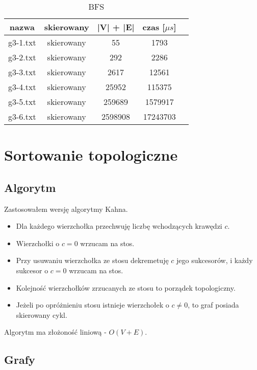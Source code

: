 \documentclass[12pt, letterpaper]{article}
\begin{document}
\begin{table}[H]\centering
    \caption{BFS}
    \begin{tabular}{|c|c|c|c|c|}\hline
        nazwa    & skierowany & |V| + |E| & czas [$\mu s$] \\\hline
        g3-1.txt & skierowany & 55        & 1793      \\\hline
        g3-2.txt & skierowany & 292       & 2286      \\\hline
        g3-3.txt & skierowany & 2617      & 12561     \\\hline
        g3-4.txt & skierowany & 25952     & 115375    \\\hline
        g3-5.txt & skierowany & 259689    & 1579917   \\\hline
        g3-6.txt & skierowany & 2598908   & 17243703  \\\hline
    \end{tabular}
\end{table}

\clearpage

\section{Sortowanie topologiczne}

\subsection{Algorytm}

Zastosowałem wersję algorytmy Kahna.

\begin{itemize}
    \item Dla każdego wierzchołka przechwuję liczbę wchodzących krawędzi $c$.
    \item Wierzchołki o $c=0$ wrzucam na stos.
    \item Przy usuwaniu wierzchołka ze stosu dekremetuję $c$ jego sukcesorów,
          i każdy sukcesor o $c=0$ wrzucam na stos.
    \item Kolejność wierzchołków zrzucanych ze stosu to porządek topologiczny.
    \item Jeżeli po opróżnieniu stosu istnieje wierzchołek o $c \neq 0$,
          to graf posiada skierowany cykl.
\end{itemize}

Algorytm ma złożoność liniową - $O(V + E)$.

\subsection{Grafy}
\end{document}

